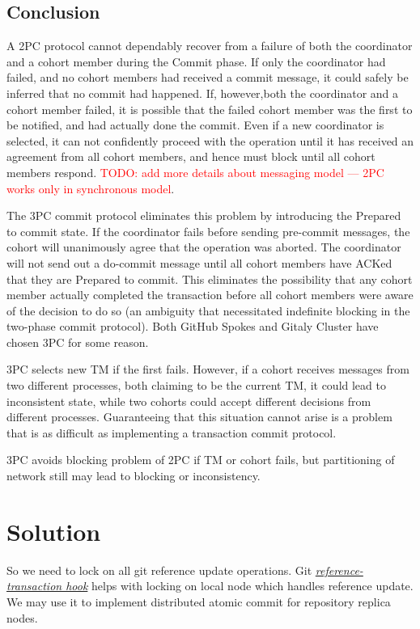 \documentclass[sigplan, screen, nonacm, 11pt]{acmart}
\newcommand{\todo}[1]{\textcolor{red}{TODO: #1}}
\begin{document}
\subsection{Conclusion}

A 2PC protocol cannot dependably recover from a failure of both the coordinator and a cohort member during the Commit phase.
If only the coordinator had failed, and no cohort members had received a commit message, it could safely be inferred
that no commit had happened.
If, however,both the coordinator and a cohort member failed, it is possible that the failed cohort member was the first
to be notified, and had actually done the commit.
Even if a new coordinator is selected, it can not confidently proceed with the operation until it has received
an agreement from all cohort members, and hence must block until all cohort members respond.
\todo{add more details about messaging model --- 2PC works only in synchronous model}.

The 3PC commit protocol eliminates this problem by introducing the Prepared to commit state.
If the coordinator fails before sending pre-commit messages, the cohort will unanimously agree that the operation was aborted.
The coordinator will not send out a do-commit message until all cohort members have ACKed that they are Prepared to commit.
This eliminates the possibility that any cohort member actually completed the transaction before all cohort
members were aware of the decision to do so (an ambiguity that necessitated indefinite blocking
in the two-phase commit protocol). Both GitHub Spokes and Gitaly Cluster have chosen 3PC for some reason.

3PC selects new TM if the first fails.
However, if a cohort receives messages from two different processes,
both claiming to be the current TM, it could lead to inconsistent state,
while two cohorts could accept different decisions from different processes.
Guaranteeing that this situation cannot arise is a problem
that is as difficult as implementing a transaction commit protocol.

3PC avoids blocking problem of 2PC if TM or cohort fails,
but partitioning of network still may lead to blocking or inconsistency.


\section{Solution}

So we need to lock on all git reference update operations.
Git \emph{\href{https://git-scm.com/docs/githooks.html\#\_reference\_transaction}{reference-transaction hook}}
helps with locking on local node which handles reference update. We may use it to implement distributed atomic commit
for repository replica nodes.
\end{document}
